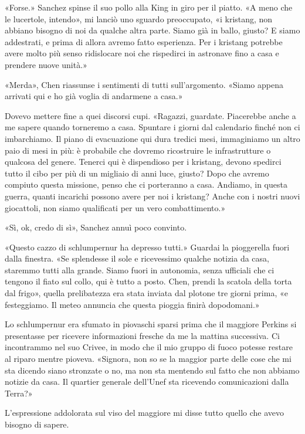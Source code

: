«Forse.» Sanchez spinse il suo pollo alla King in giro per il piatto. «A
meno che le lucertole, intendo», mi lanciò uno sguardo preoccupato, «i
kristang, non abbiano bisogno di noi da qualche altra parte. Siamo già
in ballo, giusto? E siamo addestrati, e prima di allora avremo fatto
esperienza. Per i kristang potrebbe avere molto più senso ridislocare
noi che rispedirci in astronave fino a casa e prendere nuove unità.»

«Merda», Chen riassunse i sentimenti di tutti sull'argomento. «Siamo
appena arrivati qui e ho già voglia di andarmene a casa.»

Dovevo mettere fine a quei discorsi cupi. «Ragazzi, guardate. Piacerebbe
anche a me sapere quando torneremo a casa. Spuntare i giorni dal
calendario finché non ci imbarchiamo. Il piano di evacuazione qui dura
tredici mesi, immaginiamo un altro paio di mesi in più: è probabile che
dovremo ricostruire le infrastrutture o qualcosa del genere. Tenerci qui
è dispendioso per i kristang, devono spedirci tutto il cibo per più di
un migliaio di anni luce, giusto? Dopo che avremo compiuto questa
missione, penso che ci porteranno a casa. Andiamo, in questa guerra,
quanti incarichi possono avere per noi i kristang? Anche con i nostri
nuovi giocattoli, non siamo qualificati per un vero combattimento.»

«Sì, ok, credo di sì», Sanchez annuì poco convinto.

«Questo cazzo di schlumpernur ha depresso tutti.» Guardai la pioggerella
fuori dalla finestra. «Se splendesse il sole e ricevessimo qualche
notizia da casa, staremmo tutti alla grande. Siamo fuori in autonomia,
senza ufficiali che ci tengono il fiato sul collo, qui è tutto a posto.
Chen, prendi la scatola della torta dal frigo», quella prelibatezza era
stata inviata dal plotone tre giorni prima, «e festeggiamo. Il meteo
annuncia che questa pioggia finirà dopodomani.»

\hfill\break

Lo schlumpernur era sfumato in piovaschi sparsi prima che il maggiore
Perkins si presentasse per ricevere informazioni fresche da me la
mattina successiva. Ci incontrammo nel suo Crivee, in modo che il mio
gruppo di fuoco potesse restare al riparo mentre pioveva. «Signora, non
so se la maggior parte delle cose che mi sta dicendo siano stronzate o
no, ma non sta mentendo sul fatto che non abbiamo notizie da casa. Il
quartier generale dell'Unef sta ricevendo comunicazioni dalla Terra?»

L'espressione addolorata sul viso del maggiore mi disse tutto quello che
avevo bisogno di sapere.

